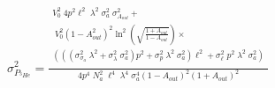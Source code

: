 


\begin{eqnarray*}
  \sigma_{P_{^3He}}^2 = \frac{
\begin{array}{c}
	V_0^2\;4 p^2\ell^2\;\lambda^2\;\sigma_a^2\;\sigma_{A_{out}}^2 + \\
	\;V_0^2\left(1 - A_{out}^2\right)^2 \ln^2\left(\sqrt{\frac{1 + A_{out}}{1-A_{out}}} \right) \times \\
	\left(\left(\left(\sigma_{\sigma_a}^2\;\lambda^2 + \sigma_\lambda^2\;\sigma_a^2\right) p^2 + \sigma_p^2\;\lambda^2\;\sigma_a^2\right) \ell^2 + \sigma_\ell^2\;p^2\;\lambda^2\;\sigma_a^2\right)\\
	\end{array}
	}{4 p^4\;N_a^2\;\ell^4\;\lambda^4\;\sigma_a^4 \left(1 - A_{out}\right)^2 \left( 1 + A_{out}\right)^2}
\end{eqnarray*}


